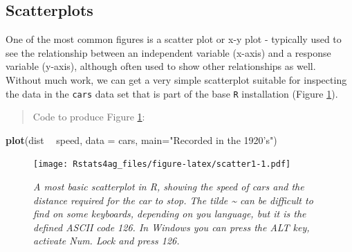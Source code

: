 \documentclass[letterpaper,]{book}
\newenvironment{Shaded}{\begin{snugshade}}{\end{snugshade}}
\newcommand{\DataTypeTok}[1]{\textcolor[rgb]{0.13,0.29,0.53}{#1}}
\newcommand{\KeywordTok}[1]{\textcolor[rgb]{0.13,0.29,0.53}{\textbf{#1}}}
\newcommand{\NormalTok}[1]{#1}
\newcommand{\OperatorTok}[1]{\textcolor[rgb]{0.81,0.36,0.00}{\textbf{#1}}}
\newcommand{\StringTok}[1]{\textcolor[rgb]{0.31,0.60,0.02}{#1}}
\begin{document}
\hypertarget{scatterplots}{%
\subsection{Scatterplots}\label{scatterplots}}

One of the most common figures is a scatter plot or x-y plot - typically used to see the relationship between an independent variable (x-axis) and a response variable (y-axis), although often used to show other relationships as well. Without much work, we can get a very simple scatterplot suitable for inspecting the data in the \texttt{cars} data set that is part of the base \texttt{R} installation (Figure \ref{fig:scatter1}).

\begin{quote}
Code to produce Figure \ref{fig:scatter1}:
\end{quote}

\begin{Shaded}
\begin{Highlighting}[]
\KeywordTok{plot}\NormalTok{(dist }\OperatorTok{~}\StringTok{ }\NormalTok{speed, }\DataTypeTok{data =}\NormalTok{ cars, }\DataTypeTok{main=}\StringTok{"Recorded in the 1920's"}\NormalTok{)}
\end{Highlighting}
\end{Shaded}

\begin{figure}
\centering
\texttt{[image: Rstats4ag\_files/figure-latex/scatter1-1.pdf]}
\caption{\label{fig:scatter1}\emph{A most basic scatterplot in R, showing the speed of cars and the distance required for the car to stop. The tilde \textasciitilde{} can be difficult to find on some keyboards, depending on you language, but it is the defined ASCII code 126. In Windows you can press the ALT key, activate Num. Lock and press 126.}}
\end{figure}
\end{document}
